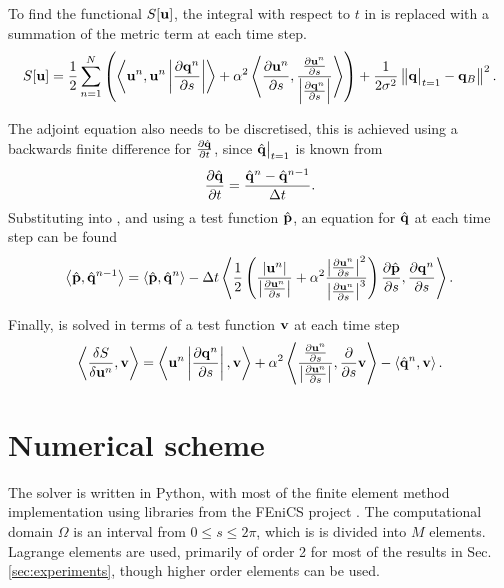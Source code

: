 \documentclass[a4paper, 12pt]{article}
\begin{document}
To find the functional $S[\mathbf{u}]$, the integral with respect to $t$ in
 is replaced with a summation of the metric term at each time step.
\begin{equation}
  \label{eq:S_disc}
  S[\mathbf{u}] = \frac{1}{2} \displaystyle \sum_{n=1}^N   \left( 
    \left\langle \mathbf{u}^n, \mathbf{u}^n \left| \frac{\partial \mathbf{q}^n}{\partial s} \right| \right\rangle  + 
  \alpha^2 
  \left\langle \frac{\partial \mathbf{u}^n}{\partial s}, 
    \frac{\frac{\partial \mathbf{u}^n}{\partial s}}{\left|\frac{\partial \mathbf{q}^n}{\partial s}\right|} \right\rangle\right)
  + \frac{1}{2\sigma^2}\left\Vert \mathbf{q}\big|_{t=1} - \mathbf{q}_B\right\Vert^2.
\end{equation}


The adjoint equation  also needs to be discretised, this is achieved
using a backwards finite difference for $\frac{\partial \hat{\mathbf{q}}}{\partial t}$, since $\hat{\mathbf{q}}\big|_{t=1}$ is known from 
\begin{equation}
  \label{eq:disc_dqhdt}
  \frac{\partial \hat{\mathbf{q}}}{\partial t} = \frac{\hat{\mathbf{q}}^{n} - \hat{\mathbf{q}}^{n-1}}{\Delta t}.
\end{equation}
Substituting  into , and using a test function $\hat{\mathbf{p}}$, an equation for $\hat{\mathbf{q}}$ at each time step can be found
\begin{equation}
  \label{eq:disc_qh}
  \left\langle \hat{\mathbf{p}}, \hat{\mathbf{q}}^{n-1} \right\rangle = \left\langle \hat{\mathbf{p}}, \hat{\mathbf{q}}^{n} \right\rangle - 
  \Delta t\left\langle \frac{1}{2}\left(\frac{\left|\mathbf{u}^n\right|}{\left|\frac{\partial \mathbf{u}^n}{\partial s}\right|} + \alpha^2\frac{\left|\frac{\partial \mathbf{u}^n}{\partial s}\right|^2}{\left|\frac{\partial \mathbf{u}^n}{\partial s}\right|^3}\right)
    \frac{\partial \hat{\mathbf{p}}}{\partial s}, \frac{\partial \mathbf{q}^n}{\partial s} \right\rangle.
  \end{equation}


Finally,  is solved in terms of a test function $\mathbf{v}$ at
each time step
\begin{equation}
  \label{eq:dSdu}
  \left\langle \frac{\delta S}{\delta \mathbf{u}^n}, \mathbf{v} \right\rangle = 
  \left\langle \mathbf{u}^n \left|\frac{\partial \mathbf{q}^n}{\partial s}\right|, \mathbf{v} \right\rangle 
  + \alpha^2 \left\langle \frac{\frac{\partial \mathbf{u}^n}{\partial s}}{\left|\frac{\partial \mathbf{u}^n}{\partial s}\right|},
    \frac{\partial }{\partial s}\mathbf{v} \right\rangle
  - \left\langle \hat{\mathbf{q}}^n,\mathbf{v} \right\rangle.
\end{equation}

\section{Numerical scheme\label{sec:implementation}}

The solver is written in Python, with most of the finite element method
implementation using libraries from the FEniCS project
\cite{logg2007fenics}. The computational domain $\Omega$ is an interval from $0
\leq s \leq 2\pi$, which is is divided into $M$ elements. Lagrange elements are
used, primarily of order 2 for most of the results in
Sec. \ref{sec:experiments}, though higher order elements can be used.
\end{document}
